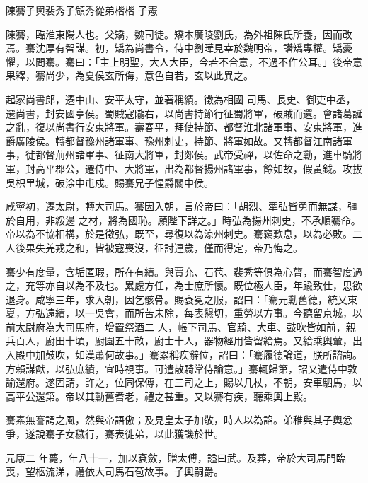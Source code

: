 
\begin{pinyinscope}

 陳騫子輿裴秀子頠秀從弟楷楷
 子憲



 陳騫，臨淮東陽人也。父矯，魏司徒。矯本廣陵劉氏，為外祖陳氏所養，因而改焉。騫沈厚有智謀。初，矯為尚書令，侍中劉曄見幸於魏明帝，譖矯專權。矯憂懼，以問騫。騫曰：「主上明聖，大人大臣，今若不合意，不過不作公耳。」後帝意果釋，騫尚少，為夏侯玄所侮，意色自若，玄以此異之。



 起家尚書郎，遷中山、安平太守，並著稱績。徵為相國
 司馬、長史、御吏中丞，遷尚書，封安國亭侯。蜀賊寇隴右，以尚書持節行征蜀將軍，破賊而還。會諸葛誕之亂，復以尚書行安東將軍。壽春平，拜使持節、都督淮北諸軍事、安東將軍，進爵廣陵侯。轉都督豫州諸軍事、豫州刺史，持節、將軍如故。又轉都督江南諸軍事，徙都督荊州諸軍事、征南大將軍，封郯侯。武帝受禪，以佐命之勳，進車騎將軍，封高平郡公，遷侍中、大將軍，出為都督揚州諸軍事，餘如故，假黃鉞。攻拔吳枳里城，破涂中屯戍。賜騫兄子惺爵關中侯。



 咸寧初，遷太尉，轉大司馬。騫因入朝，言於帝曰：「胡烈、牽弘皆勇而無謀，彊於自用，非綏邊
 之材，將為國恥。願陛下詳之。」時弘為揚州刺史，不承順騫命。帝以為不協相構，於是徵弘，既至，尋復以為涼州刺史。騫竊歎息，以為必敗。二人後果失羌戎之和，皆被寇喪沒，征討連歲，僅而得定，帝乃悔之。



 騫少有度量，含垢匿瑕，所在有績。與賈充、石苞、裴秀等俱為心膂，而騫智度過之，充等亦自以為不及也。累處方任，為士庶所懷。既位極人臣，年踰致仕，思欲退身。咸寧三年，求入朝，因乞骸骨。賜袞冕之服，詔曰：「騫元勳舊德，統乂東夏，方弘遠績，以一吳會，而所苦未除，每表懇切，重勞以方事。今聽留京城，以前太尉府為大司馬府，增置祭酒二
 人，帳下司馬、官騎、大車、鼓吹皆如前，親兵百人，廚田十頃，廚園五十畝，廚士十人，器物經用皆留給焉。又給乘輿輦，出入殿中加鼓吹，如漢蕭何故事。」騫累稱疾辭位，詔曰：「騫履德論道，朕所諮詢。方賴謀猷，以弘庶績，宜時視事。可遣散騎常侍諭意。」騫輒歸第，詔又遣侍中敦諭還府。遂固請，許之，位同保傅，在三司之上，賜以几杖，不朝，安車駟馬，以高平公還第。帝以其勳舊耆老，禮之甚重。又以騫有疾，聽乘輿上殿。



 騫素無謇諤之風，然與帝語傲；及見皇太子加敬，時人以為諂。弟稚與其子輿忿爭，遂說騫子女穢行，騫表徙弟，以此獲譏於世。



 元康二
 年薨，年八十一，加以袞斂，贈太傅，謚曰武。及葬，帝於大司馬門臨喪，望柩流涕，禮依大司馬石苞故事。子輿嗣爵。




\end{pinyinscope}
